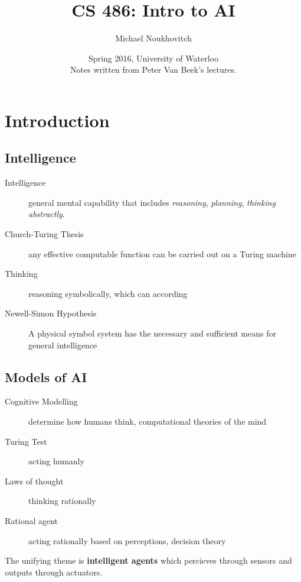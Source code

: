 \documentclass[]{article}
\theoremstyle{definition}
\begin{document}
	\let\ref\Cref

	\title{\bf{CS 486: Intro to AI}}
	\date{Spring 2016, University of Waterloo \\ \center Notes written from Peter Van Beek's lectures.}
	\author{Michael Noukhovitch}

	\maketitle
	\newpage
	\tableofcontents
	\newpage

	\section{Introduction}
	
	\subsection{Intelligence}
	\begin{description}
		\item[Intelligence] general mental capability that includes \textit{reasoning}, \textit{planning}, \textit{thinking abstractly}.
		\item[Church-Turing Thesis] any effective computable function can be carried out on a Turing machine
		\item[Thinking] reasoning symbolically, which can according
		\item[Newell-Simon Hypothesis] A physical symbol system has the necessary and sufficient means for general intelligence
	\end{description}

	\subsection{Models of AI}
	\begin{description}
		\item[Cognitive Modelling] determine how humans think, computational theories of the mind
		\item[Turing Test] acting humanly
		\item[Laws of thought] thinking rationally
		\item[Rational agent] acting rationally based on perceptions, decision theory
	\end{description}
	The unifying theme is \textbf{intelligent agents} which percieves through sensors and outputs through actuators.
\end{document}
